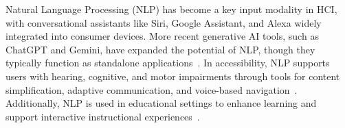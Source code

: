 %
%

Natural Language Processing (NLP) has become a key input modality in HCI, with conversational assistants like Siri, Google Assistant, and Alexa widely integrated into consumer devices. More recent generative AI tools, such as ChatGPT and Gemini, have expanded the potential of NLP, though they typically function as standalone applications~\cite{openai_chatgpt, google_gemini}. In accessibility, NLP supports users with hearing, cognitive, and motor impairments through tools for content simplification, adaptive communication, and voice-based navigation~\cite{gironbastidas2019nlp, martinez2024tool, avalos2025context}. Additionally, NLP is used in educational settings to enhance learning and support interactive instructional experiences~\cite{terzopoulos2020voice, liu2024chatgpt}.

